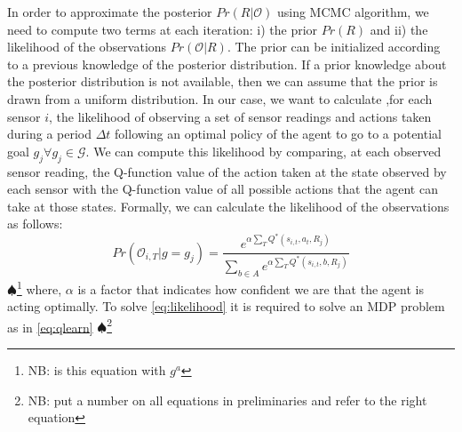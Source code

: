 \documentclass[letterpaper, 10 pt, conference]{ieeeconf}  %
\newcommand\NB[1]{$\spadesuit$\footnote{NB: #1}}
\begin{document}
In order to approximate the posterior $Pr(R|\mathcal{O})$ using MCMC algorithm, we need to compute two terms at each iteration: i) the prior $Pr(R)$ and ii) the likelihood of the observations $Pr(\mathcal{O}|R)$.
The prior can be initialized according to a previous knowledge of the posterior distribution. If a prior knowledge about the posterior distribution is not available, then we can assume that the prior is drawn from a uniform distribution.
In our case, we want to calculate ,for each sensor $i$, the likelihood of observing a set of sensor readings and actions taken during a period $\Delta t$ following an optimal policy of the agent to go to a potential goal $g_j \forall g_j \in \mathcal G$. We can compute this likelihood by comparing, at each observed sensor reading, the Q-function value of the action taken at the state observed by each sensor with the Q-function value of all possible actions that the agent can take at those states. Formally, we can calculate the likelihood of the observations as follows:
\begin{equation}\label{eq:likelihood}
Pr(\mathcal{O}_{i,T} | g = g_j)  = \frac{e^{\alpha\sum_{T}{Q^*(s_{i,t},a_t,R_j)}}}{\sum_{b\in A}{}e^{\alpha\sum_{T}{}Q^*(s_{i,t},b,R_j)}}
\end{equation}
\NB{is this equation with $g^a$}
where, $\alpha$ is a factor that indicates how confident we are that the agent is acting optimally. To solve \eqref{eq:likelihood} it is required to solve an MDP problem as in \eqref{eq:qlearn} \NB{put a number on all equations in preliminaries and refer to the right equation}




%


\end{document}
